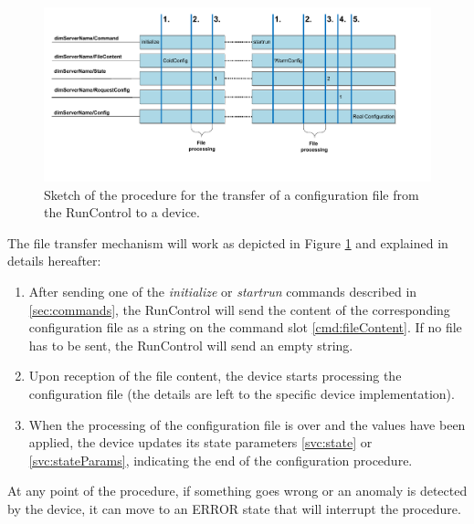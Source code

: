 \documentclass[a4paper]{article}
\begin{document}
\begin{figure}
	\center
	\includegraphics[width=\textwidth]{Doc/Configuration}
	\caption{Sketch of the procedure for the transfer of a configuration file from
	the RunControl to a device.}
	\label{fig:fileTransfer}
\end{figure}
The file transfer mechanism will work as depicted in Figure \ref{fig:fileTransfer} and explained in
details hereafter:
\begin{enumerate}
	\item \label{transf:start} After sending one of the \textit{initialize} or
	\textit{startrun} commands described in \ref{sec:commands}, the RunControl
	will send the content of the corresponding configuration file as a string on
	the command slot \ref{cmd:fileContent}. If no file has to be sent, the
	RunControl will send an empty string.
	\item Upon reception of the file content, the device starts processing the
	configuration file (the details are left to the specific device
	implementation).
	\item When the processing of the configuration file is over and the values have
	been applied, the device updates its state parameters \ref{svc:state} or
	\ref{svc:stateParams}, indicating the end of the configuration procedure.
\end{enumerate}
At any point of the procedure, if something goes wrong or an anomaly is detected by the device, it
can move to an ERROR state that will interrupt the procedure.
\end{document}
